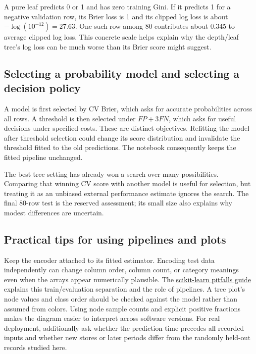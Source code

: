 A pure leaf predicts 0 or 1 and has zero training Gini. If it predicts 1 for a negative validation row,
its Brier loss is 1 and its clipped log loss is about $-\log(10^{-12})=27.63$.
One such row among 80 contributes about 0.345 to average clipped log loss. This concrete scale helps explain
why the depth/leaf tree's log loss can be much worse than its Brier score might suggest.

\subsection*{Selecting a probability model and selecting a decision policy}
A model is first selected by CV Brier, which asks for accurate probabilities across all rows.
A threshold is then selected under $FP+3FN$, which asks for useful decisions under specified costs.
These are distinct objectives. Refitting the model after threshold selection could change its score distribution
and invalidate the threshold fitted to the old predictions. The notebook consequently keeps the fitted pipeline unchanged.

The best tree setting has already won a search over many possibilities. Comparing that winning CV score with
another model is useful for selection, but treating it as an unbiased external performance estimate ignores the search.
The final 80-row test is the reserved assessment; its small size also explains why modest differences are uncertain.

\subsection*{Practical tips for using pipelines and plots}
Keep the encoder attached to its fitted estimator. Encoding test data independently can change column order,
column count, or category meanings even when the arrays appear numerically plausible.
The \href{https://scikit-learn.org/1.8/common_pitfalls.html}{scikit-learn pitfalls guide}
explains this train/evaluation separation and the role of pipelines.
A tree plot's node values and class order should be checked against the model rather than assumed from colors.
Using node sample counts and explicit positive fractions makes the diagram easier to interpret across software versions.
For real deployment, additionally ask whether the prediction time precedes all recorded inputs and whether new
stores or later periods differ from the randomly held-out records studied here.


